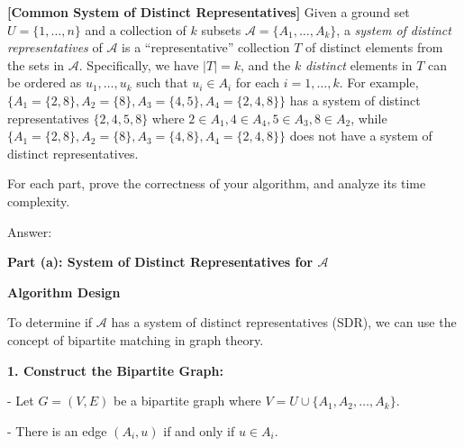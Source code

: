 \documentclass{oxmathproblems}
\begin{document}
\begin{questions}
\miquestion[25] \textbf{[Common System of Distinct Representatives]}
Given a ground set $U=\{1,\ldots,n\}$ and a collection of $k$ subsets $\mathcal{A}=\{A_1,\ldots,A_k\}$, a \emph{system of distinct representatives} of $\mathcal{A}$ is a ``representative'' collection $T$ of distinct elements from the sets in $\mathcal{A}$.
Specifically, we have $|T|=k$, and the $k$ \emph{distinct} elements in $T$ can be ordered as $u_1,\ldots,u_k$ such that $u_i\in A_i$ for each $i=1,\ldots,k$.
For example, $\{A_1=\{2,8\},A_2=\{8\},A_3=\{4,5\},A_4=\{2,4,8\}\}$ has a system of distinct representatives $\{2,4,5,8\}$ where $2\in A_1,4\in A_4,5\in A_3,8\in A_2$, while $\{A_1=\{2,8\},A_2=\{8\},A_3=\{4,8\},A_4=\{2,4,8\}\}$ does not have a system of distinct representatives.
For each part, prove the correctness of your algorithm, and analyze its time complexity.

Answer:

\textbf{Part (a): System of Distinct Representatives for \(\mathcal{A}\)}

\textbf{Algorithm Design}

To determine if \(\mathcal{A}\) has a system of distinct representatives (SDR), we can use the concept of bipartite matching in graph theory.

\textbf{1. Construct the Bipartite Graph:}

   - Let \( G = (V, E) \) be a bipartite graph where \( V = U \cup \{A_1, A_2, \ldots, A_k\} \).
   
   - There is an edge \( (A_i, u) \) if and only if \( u \in A_i \).


\end{questions}
\end{document}
